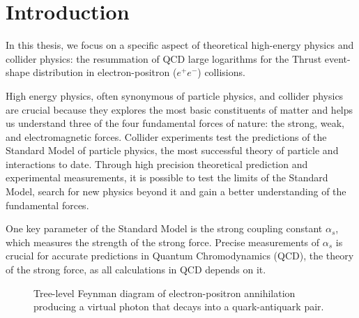 \documentclass[../main.tex]{subfiles}
\begin{document}
\chapter{Introduction}\label{ch:introduction}

In this thesis, we focus on a specific aspect of theoretical high-energy physics and collider physics: the resummation of QCD large logarithms for 
the Thrust event-shape distribution in electron-positron ($e^+e^-$) collisions.

High energy physics, often synonymous of particle physics, and collider physics are crucial because 
they explores the most basic constituents of matter and helps us understand three of the four fundamental forces of nature: 
the strong, weak, and electromagnetic forces. Collider experiments test the predictions of the Standard Model of particle physics,
the most successful theory of particle and interactions to date. Through high precision theoretical prediction and experimental measurements,
it is possible to test the limits of the Standard Model, search for new physics beyond it and gain a better understanding of the fundamental forces. 

One key parameter of the Standard Model is the strong coupling constant $\alpha_s$, which measures the strength of the strong force.
Precise measurements of $\alpha_s$ is crucial for accurate predictions in Quantum Chromodynamics (QCD), the theory of the strong force, as all calculations in QCD
depends on it.

\begin{figure}[h!]
    \centering
    \caption{Tree-level Feynman diagram of electron-positron annihilation producing a virtual photon that decays into a quark-antiquark pair.}
    \label{fig:ep_annihilation}
\end{figure}
\end{document}
